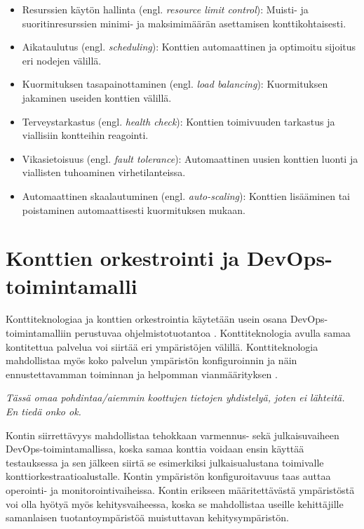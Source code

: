\begin{itemize}
\item Resurssien käytön hallinta (engl. \textit{resource limit control}): Muisti- ja suoritinresurssien minimi- ja maksimimäärän asettamisen konttikohtaisesti.
\item Aikataulutus (engl. \textit{scheduling}): Konttien automaattinen ja optimoitu sijoitus eri nodejen välillä.
\item Kuormituksen tasapainottaminen (engl. \textit{load balancing}): Kuormituksen jakaminen useiden konttien välillä. 
\item Terveystarkastus (engl. \textit{health check}): Konttien toimivuuden tarkastus ja viallisiin kontteihin reagointi.
\item Vikasietoisuus (engl. \textit{fault tolerance}): Automaattinen uusien konttien luonti ja viallisten tuhoaminen virhetilanteissa.
\item Automaattinen skaalautuminen (engl. \textit{auto-scaling}): Konttien lisääminen tai poistaminen automaattisesti kuormituksen mukaan.
\end{itemize}



\section{Konttien orkestrointi ja DevOps-toimintamalli}

Konttiteknologiaa ja konttien orkestrointia käytetään usein osana DevOps-toimintamalliin perustuvaa ohjelmistotuotantoa \cite{Kang16, Narasimhulu23}.
Konttiteknologia avulla samaa kontitettua palvelua voi siirtää eri ympäristöjen välillä.
Konttiteknologia mahdollistaa myös koko palvelun ympäristön konfiguroinnin ja näin ennustettavamman toiminnan ja helpomman vianmäärityksen \cite{Narasimhulu23}.

\textit{Tässä omaa pohdintaa/aiemmin koottujen tietojen yhdistelyä, joten ei lähteitä. En tiedä onko ok.}

Kontin siirrettävyys mahdollistaa tehokkaan varmennus- sekä julkaisuvaiheen DevOps-toimintamallissa, koska samaa konttia voidaan ensin käyttää testauksessa ja sen jälkeen siirtä se esimerkiksi julkaisualustana toimivalle konttiorkestraatioalustalle.
Kontin ympäristön konfiguroitavuus taas auttaa operointi- ja monitorointivaiheissa.
Kontin erikseen määritettävästä ympäristöstä voi olla hyötyä myös kehitysvaiheessa, koska se mahdollistaa useille kehittäjille samanlaisen tuotantoympäristöä muistuttavan kehitysympäristön.

